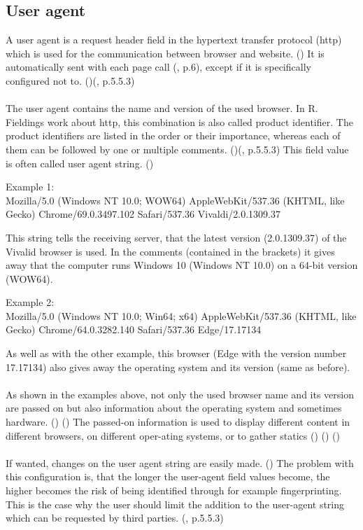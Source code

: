 \subsection{User agent}\label{UAS}
A user agent is a request header field in the hypertext transfer protocol (http) which is used for the communication between browser and website. (\textcite{xovi18}) It is automatically sent with each page call (\textcite{doty18}, p.6), except if it is specifically configured not to. (\textcite{xovi18})(\textcite{fielding14}, p.5.5.3)\\\\
The user agent contains the name and version of the used browser. In R. Fieldings work about http, this combination is also called product identifier. The product identifiers are listed in the order or their importance, whereas each of them can be followed by one or multiple comments. (\textcite{xovi18})(\textcite{fielding14}, p.5.5.3) This field value is often called user agent string. (\textcite{hoffman16})\\
\begin{tcolorbox}
Example 1: \\
Mozilla/5.0 (Windows NT 10.0; WOW64) AppleWebKit/537.36 (KHTML, like Gecko) Chrome/69.0.3497.102 Safari/537.36 Vivaldi/2.0.1309.37
\end{tcolorbox}
This string tells the receiving server, that the latest version (2.0.1309.37) of the Vivalid browser is used. In the comments (contained in the brackets) it gives away that the computer runs Windows 10 (Windows NT 10.0) on a 64-bit version (WOW64).\\
\begin{tcolorbox}
Example 2:\\
Mozilla/5.0 (Windows NT 10.0; Win64; x64) AppleWebKit/537.36 (KHTML, like Gecko) Chrome/64.0.3282.140 Safari/537.36 Edge/17.17134\\
\end{tcolorbox}
As well as with the other example, this browser (Edge with the version number 17.17134) also gives away the operating system and its version (same as before).\\\\
As shown in the examples above, not only the used browser name and its version are passed on but also information about the operating system and sometimes hardware. (\textcite{hoffman16}) (\textcite{xovi18}) The passed-on information is used to display different content in different browsers, on different oper-ating systems, or to gather statics (\textcite{hoffman16}) (\textcite{arntz17}) (\textcite{xovi18})\\\\
If wanted, changes on the user agent string are easily made. (\textcite{arntz17})
The problem with this configuration is, that the longer the user-agent field values become, the higher becomes the risk of being identified through for example fingerprinting. This is the case why the user should limit the addition to the user-agent string which can be requested by third parties. (\textcite{fielding14}, p.5.5.3)


